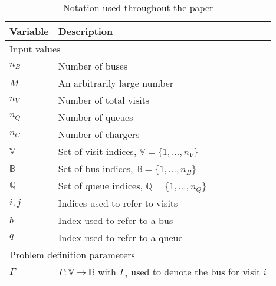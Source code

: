 \documentclass[utf8]{FrontiersinHarvard}
\begin{document}
\begin{table}[!htpb]
  \caption{Notation used throughout the paper}
  \label{tab:variables}
  \centering
  \begin{tabularx}{\textwidth}{l l}
    \toprule
    \textbf{Variable} & \textbf{Description}                                                                               \\
    \toprule
    \multicolumn{2}{l}{Input values}                                                                                       \\
    $n_B$        & Number of buses                                                                                         \\
    $M$          & An arbitrarily large number                                                               \\
    $n_V$        & Number of total visits                                                                                  \\
    $n_Q$        & Number of queues                                                                                        \\
    $n_C$ 	 & Number of chargers                                                                                      \\
    $\mathbb{V}$ & Set of visit indices, $\mathbb{V} = \{1, ..., n_V\}$                                                    \\
    $\mathbb{B}$ & Set of bus indices, $\mathbb{B} = \{1, ..., n_B\}$                                                      \\
    $\mathbb{Q}$          & Set of queue indices, $\mathbb{Q} = \{1, ..., n_Q\}$                                                             \\
    $i,j$        & Indices used to refer to visits                                                                         \\
    $b$ 	 & Index used to refer to a bus                                                                            \\
    $q$ 	 & Index used to refer to a queue                                                                          \\
    \hline
    \multicolumn{2}{l}{Problem definition parameters}                                                                      \\
    $\Gamma$   & $\Gamma: \mathbb{V} \rightarrow \mathbb{B}$ with $\Gamma_i$ used to denote the bus for visit $i$                                   \\

\end{tabularx}
\end{table}
\end{document}
